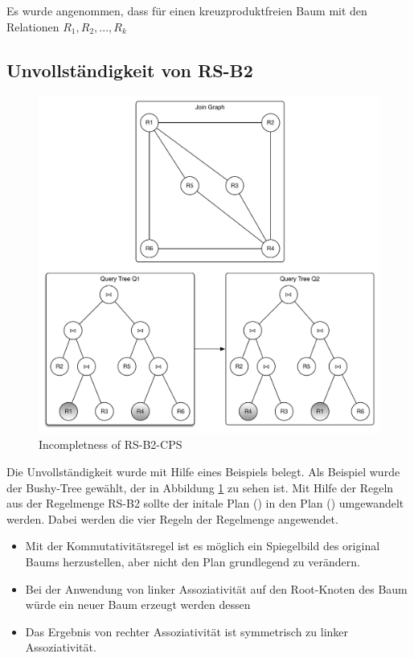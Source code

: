 Es wurde angenommen, dass für einen kreuzproduktfreien Baum mit den Relationen $R_1, R_2, ..., R_k$


\subsection{Unvollständigkeit von RS-B2}

\begin{figure}[ht]
  \centering
  \includegraphics[width=\textwidth]{02_Related_Work/Graphs.pdf}
  \caption{Incompletness of RS-B2-CPS}
  \label{Incompleteness_RS-B2-CPS}
\end{figure}


Die Unvollständigkeit wurde mit Hilfe eines Beispiels belegt. Als Beispiel wurde der Bushy-Tree gewählt, der in Abbildung \ref{Incompleteness_RS-B2-CPS} zu sehen ist. Mit Hilfe der Regeln aus der Regelmenge RS-B2 sollte der initale Plan () in den Plan () umgewandelt werden. Dabei werden die vier Regeln der Regelmenge angewendet.

\begin{itemize}
\item Mit der Kommutativitätsregel ist es möglich ein Spiegelbild des original Baums herzustellen, aber nicht den Plan grundlegend zu verändern.
\item Bei der Anwendung von linker Assoziativität auf den Root-Knoten des Baum würde ein neuer Baum erzeugt werden dessen
\item Das Ergebnis von rechter Assoziativität ist symmetrisch zu linker Assoziativität.
\end{itemize}


